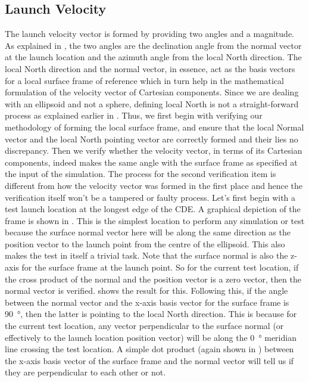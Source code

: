 \subsection{Launch Velocity}
\label{subsec:launch_velocity_vv}
The launch velocity vector is formed by providing two angles and a magnitude. As explained in , the two angles are the declination angle from the normal vector at the launch location and the azimuth angle from the local North direction. The local North direction and the normal vector, in essence, act as the basis vectors for a local surface frame of reference which in turn help in the mathematical formulation of the velocity vector of Cartesian components. Since we are dealing with an ellipsoid and not a sphere, defining local North is not a straight-forward process as explained earlier in .
%
\newline\newline
%
Thus, we first begin with verifying our methodology of forming the local surface frame, and ensure that the local Normal vector and the local North pointing vector are correctly formed and their lies no discrepancy. Then we verify whether the velocity vector, in terms of its Cartesian components, indeed makes the same angle with the surface frame as specified at the input of the simulation. The process for the second verification item is different from how the velocity vector was formed in the first place and hence the verification itself won't be a tampered or faulty process.
%
\newline\newline
%
Let's first begin with a test launch location at the longest edge of the \gls{CDE}. A graphical depiction of the frame is shown in . This is the simplest location to perform any simulation or test because the surface normal vector here will be along the same direction as the position vector to the launch point from the centre of the ellipsoid. This also makes the test in itself a trivial task. Note that the surface normal is also the z-axis for the surface frame at the launch point. So for the current test location, if the cross product of the normal and the position vector is a zero vector, then the normal vector is verified.  shows the result for this. Following this, if the angle between the normal vector and the x-axis basis vector for the surface frame is \SI{90}{\degree}, then the latter is pointing to the local North direction. This is because for the current test location, any vector perpendicular to the surface normal (or effectively to the launch location position vector) will be along the \SI{0}{\degree} meridian line crossing the test location. A simple dot product (again shown in ) between the x-axis basis vector of the surface frame and the normal vector will tell us if they are perpendicular to each other or not.
